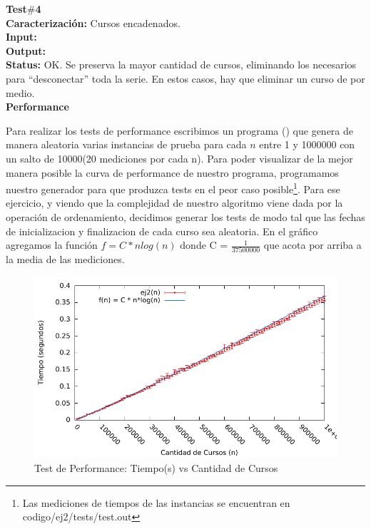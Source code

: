 \noindent\textbf{Test$\#$4}\\
\textbf{Caracterización:} Cursos encadenados.\\
\textbf{Input:} \\
\textbf{Output:} \\
\textbf{Status:} OK. Se preserva la mayor cantidad de cursos, eliminando los necesarios para ``desconectar'' toda la serie. En estos casos, hay que eliminar un curso de por medio.\\

\newpage
\textbf{Performance}\\
\par{Para realizar los tests de performance escribimos un programa () que genera de manera aleatoria varias instancias de prueba para cada $n$ entre 1 y 1000000 con un salto de 10000(20 mediciones por cada n). Para poder visualizar de la mejor manera posible la curva de performance de nuestro programa, programamos nuestro generador para que produzca tests en el peor caso posible\footnote{Las mediciones de tiempos de las instancias se encuentran en codigo/ej2/tests/test.out}. Para ese ejercicio, y viendo que la complejidad de nuestro algoritmo viene dada por la operación de ordenamiento, decidimos generar los tests de modo tal que las fechas de inicializacion y finalizacion de cada curso sea aleatoria. En el gráfico agregamos la función $f = C * n log (n)$ donde C = $\frac{1}{37500000}$ } que acota por arriba a la media de las mediciones.

\begin{figure}[H]
\centering
\includegraphics{imgs/ej2.pdf}
\caption{Test de Performance: Tiempo(s) vs Cantidad de Cursos}
\end{figure}


